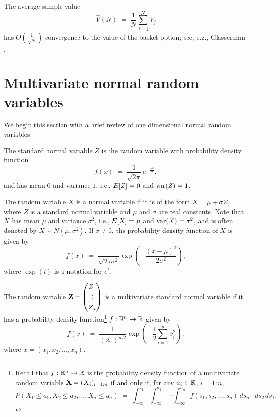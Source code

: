 
The average sample value
\[
\widehat{V}(N) \;=\; \frac{1}{N}\sum_{j=1}^N V_j
\]
has $O\!\left(\frac{1}{\sqrt{N}}\right)$ convergence to the value of the basket option; see,
e.g., Glasserman \cite{17}.

\section{Multivariate normal random variables}

We begin this section with a brief review of one dimensional normal random variables.

The standard normal variable $Z$ is the random variable with probability density function
\begin{equation}
f(x) \;=\; \frac{1}{\sqrt{2\pi}}\,e^{-\frac{x^2}{2}},
\end{equation}
and has mean $0$ and variance $1$, i.e., $E\!\left[Z\right]=0$ and $\operatorname{var}(Z)=1$.

The random variable $X$ is a normal variable if it is of the form $X=\mu+\sigma Z$, where $Z$ is
a standard normal variable and $\mu$ and $\sigma$ are real constants. Note that $X$ has mean
$\mu$ and variance $\sigma^2$, i.e., $E\!\left[X\right]=\mu$ and $\operatorname{var}(X)=\sigma^2$, and is often denoted by
$X\sim N(\mu,\sigma^2)$. If $\sigma\neq0$, the probability density function of $X$ is given by
\begin{equation}
f(x) \;=\; \frac{1}{\sqrt{2\pi\sigma^2}}\exp\!\left(-\frac{(x-\mu)^2}{2\sigma^2}\right),
\end{equation}
where $\exp(t)$ is a notation for $e^t$.

\begin{definition}
The random variable $\mathbf{Z} = \begin{pmatrix} Z_1 \\ \vdots \\ Z_n \end{pmatrix}$ is a
multivariate standard normal variable if it has a probability density function\footnote{Recall
that $f:\mathbb{R}^n\to\mathbb{R}$ is the probability density function of a multivariate random variable
$\mathbf{X}=(X_i)_{i=1:n}$ if and only if, for any $a_i\in\mathbb{R}$, $i=1:n$,
\[
P\left(X_1\le a_1,X_2\le a_2,\ldots,X_n\le a_n\right) \;=\;
\int_{-\infty}^{a_1}\int_{-\infty}^{a_2}\cdots\int_{-\infty}^{a_n}
f(s_1,s_2,\ldots,s_n)\,ds_n\cdots ds_2\,ds_1.
\]}
$f:\mathbb{R}^n\to\mathbb{R}$ given by
\begin{equation}
f(x) \;=\; \frac{1}{(2\pi)^{n/2}}\exp\!\left(-\frac12\sum_{i=1}^n x_i^2\right),
\end{equation}
where $x=(x_1,x_2,\ldots,x_n)$.
\end{definition}

